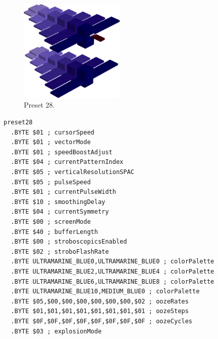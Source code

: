 \begin{minipage}[b]{0.48\linewidth}
\begin{figure}[H]                                                          
  \centering                                                             
  \begin{adjustbox}{width=5cm,center}                                   
  \includegraphics[width=5cm]{src/colorspace_presets/preset28-45.png}%
  \end{adjustbox}                                                        
\caption*{Preset 28.}                                           
\end{figure}                                                               
\end{minipage}
\hspace{0.1cm}
\begin{minipage}[b]{0.48\linewidth}                                       
\begin{lstlisting}[basicstyle=\ttfamily\tiny]
preset28
  .BYTE $01 ; cursorSpeed
  .BYTE $01 ; vectorMode
  .BYTE $01 ; speedBoostAdjust
  .BYTE $04 ; currentPatternIndex
  .BYTE $05 ; verticalResolutionSPAC
  .BYTE $05 ; pulseSpeed
  .BYTE $01 ; currentPulseWidth
  .BYTE $10 ; smoothingDelay
  .BYTE $04 ; currentSymmetry
  .BYTE $00 ; screenMode
  .BYTE $40 ; bufferLength
  .BYTE $00 ; stroboscopicsEnabled
  .BYTE $02 ; stroboFlashRate
  .BYTE ULTRAMARINE_BLUE0,ULTRAMARINE_BLUE0 ; colorPalette
  .BYTE ULTRAMARINE_BLUE2,ULTRAMARINE_BLUE4 ; colorPalette
  .BYTE ULTRAMARINE_BLUE6,ULTRAMARINE_BLUE8 ; colorPalette
  .BYTE ULTRAMARINE_BLUE10,MEDIUM_BLUE0 ; colorPalette
  .BYTE $05,$00,$00,$00,$00,$00,$00,$02 ; oozeRates
  .BYTE $01,$01,$01,$01,$01,$01,$01,$01 ; oozeSteps
  .BYTE $0F,$0F,$0F,$0F,$0F,$0F,$0F,$0F ; oozeCycles
  .BYTE $03 ; explosionMode
\end{lstlisting}
\end{minipage}

